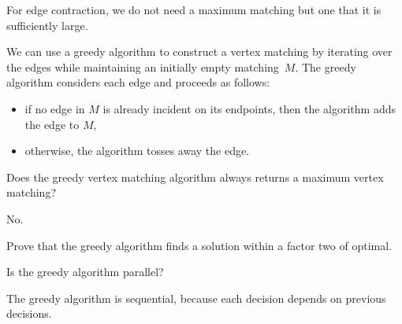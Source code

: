 \begin{note}
For edge contraction, we do not need a maximum matching but one that
it is sufficiently large.
%
\end{note}

\begin{algorithm}
\label{alg:graphcon::edge::greedy-matching}
We can use a greedy algorithm to construct a vertex matching by
iterating over the edges while maintaining an initially empty
matching~$M$.
%
The greedy algorithm considers each edge and proceeds as follows:
\begin{itemize}
\item if no edge in $M$ is already incident on its endpoints, then the
  algorithm adds the edge to $M$,

\item otherwise,  the algorithm tosses away the edge.
\end{itemize}
\end{algorithm}

\begin{flex}
\begin{exercise}
Does the greedy vertex matching algorithm always returns a maximum
vertex matching?
\end{exercise}
\begin{solution}
No.
\end{solution}
\end{flex}

\begin{exercise}
Prove that the greedy algorithm finds a solution within a factor two
of optimal.
\end{exercise}

\begin{flex}
\begin{exercise}
Is the greedy algorithm parallel?
\end{exercise}
\begin{solution}
The greedy algorithm is sequential, because each decision depends on
previous decisions.
\end{solution}
\end{flex}




